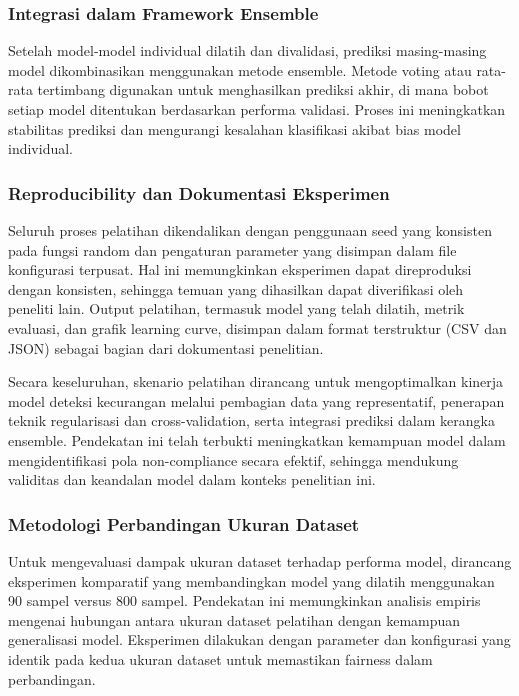 \subsubsection{Integrasi dalam Framework Ensemble}
Setelah model-model individual dilatih dan divalidasi, prediksi masing-masing model dikombinasikan menggunakan metode ensemble. Metode voting atau rata-rata tertimbang digunakan untuk menghasilkan prediksi akhir, di mana bobot setiap model ditentukan berdasarkan performa validasi. Proses ini meningkatkan stabilitas prediksi dan mengurangi kesalahan klasifikasi akibat bias model individual.

\subsubsection{Reproducibility dan Dokumentasi Eksperimen}
Seluruh proses pelatihan dikendalikan dengan penggunaan seed yang konsisten pada fungsi random dan pengaturan parameter yang disimpan dalam file konfigurasi terpusat. Hal ini memungkinkan eksperimen dapat direproduksi dengan konsisten, sehingga temuan yang dihasilkan dapat diverifikasi oleh peneliti lain. Output pelatihan, termasuk model yang telah dilatih, metrik evaluasi, dan grafik learning curve, disimpan dalam format terstruktur (CSV dan JSON) sebagai bagian dari dokumentasi penelitian.

Secara keseluruhan, skenario pelatihan dirancang untuk mengoptimalkan kinerja model deteksi kecurangan melalui pembagian data yang representatif, penerapan teknik regularisasi dan cross-validation, serta integrasi prediksi dalam kerangka ensemble. Pendekatan ini telah terbukti meningkatkan kemampuan model dalam mengidentifikasi pola non-compliance secara efektif, sehingga mendukung validitas dan keandalan model dalam konteks penelitian ini.

\subsubsection{Metodologi Perbandingan Ukuran Dataset}
Untuk mengevaluasi dampak ukuran dataset terhadap performa model, dirancang eksperimen komparatif yang membandingkan model yang dilatih menggunakan 90 sampel versus 800 sampel. Pendekatan ini memungkinkan analisis empiris mengenai hubungan antara ukuran dataset pelatihan dengan kemampuan generalisasi model. Eksperimen dilakukan dengan parameter dan konfigurasi yang identik pada kedua ukuran dataset untuk memastikan fairness dalam perbandingan.


